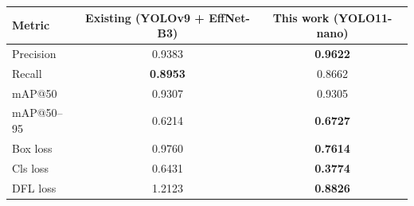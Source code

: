 \documentclass[border=10pt]{standalone}
\begin{document}
\begin{tabular}{lcc}
\toprule
\textbf{Metric} & \textbf{Existing (YOLOv9 + EffNet-B3)} & \textbf{This work (YOLO11-nano)} \\
\midrule
Precision       & 0.9383                & \textbf{0.9622} \\
Recall          & \textbf{0.8953}       & 0.8662 \\
mAP@50          & 0.9307                & 0.9305 \\
mAP@50--95      & 0.6214                & \textbf{0.6727} \\
\midrule
Box loss        & 0.9760                & \textbf{0.7614} \\
Cls loss        & 0.6431                & \textbf{0.3774} \\
DFL loss        & 1.2123                & \textbf{0.8826} \\
\bottomrule
\end{tabular}
\end{document}
